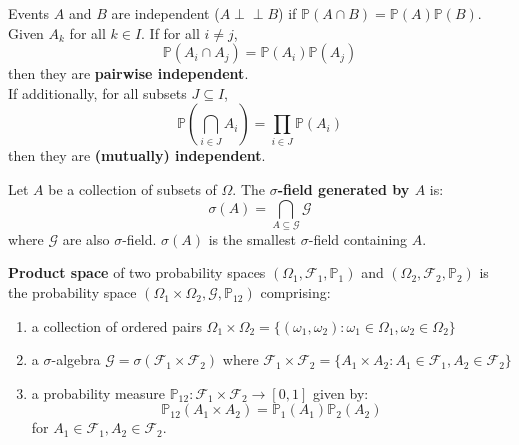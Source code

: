 \documentclass{huhtakm-template-book}
\newcommand{\independent}{\perp\!\!\!\perp}
\newcommand{\prob}{\mathbb{P}}
\begin{document}
    \newpage
    \begin{sdefn}
        Events $A$ and $B$ are independent ($A\independent B$) if $\prob(A\cap B)=\prob(A)\prob(B)$.\\
        Given $A_{k}$ for all $k\in I$. If for all $i\neq j$, 
        \begin{equation*}
            \prob(A_{i}\cap A_{j})=\prob(A_{i})\prob(A_{j})
        \end{equation*} 
        then they are \textbf{pairwise independent}.\\
        If additionally, for all subsets $J\subseteq I$,
        \begin{equation*}
            \prob\left(\bigcap_{i\in J}A_{i}\right)=\prod_{i\in J}\prob(A_{i})
        \end{equation*}
        then they are \textbf{(mutually) independent}.
    \end{sdefn}
    \begin{sdefn}
        Let $A$ be a collection of subsets of $\Omega$. The \textbf{$\sigma$-field generated by $A$} is:
        \begin{equation*}
            \sigma(A)=\bigcap_{A\subseteq\mathcal{G}}\mathcal{G}
        \end{equation*}
        where $\mathcal{G}$ are also $\sigma$-field. $\sigma(A)$ is the smallest $\sigma$-field containing $A$.
    \end{sdefn}
    \begin{sdefn}
        \textbf{Product space} of two probability spaces $(\Omega_{1},\mathcal{F}_{1},\prob_{1})$ and $(\Omega_{2},\mathcal{F}_{2},\prob_{2})$ is the probability space $(\Omega_{1}\times\Omega_{2},\mathcal{G},\prob_{12})$ comprising:
        \begin{enumerate}
        	\item a collection of ordered pairs $\Omega_{1}\times\Omega_{2}=\{(\omega_{1},\omega_{2}):\omega_{1}\in\Omega_{1},\omega_{2}\in\Omega_{2}\}$
        	\item a $\sigma$-algebra $\mathcal{G}=\sigma(\mathcal{F}_{1}\times\mathcal{F}_{2})$ where $\mathcal{F}_{1}\times\mathcal{F}_{2}=\{A_{1}\times A_{2}:A_{1}\in\mathcal{F}_{1},A_{2}\in\mathcal{F}_{2}\}$ 
        	\item a probability measure $\prob_{12}:\mathcal{F}_{1}\times\mathcal{F}_{2}\to [0,1]$ given by:
        	\begin{equation*}
        		\prob_{12}(A_{1}\times A_{2})=\prob_{1}(A_{1})\prob_{2}(A_{2})
        	\end{equation*}
        	for $A_{1}\in\mathcal{F}_{1},A_{2}\in\mathcal{F}_{2}$.
        \end{enumerate}
    \end{sdefn}
\end{document}
